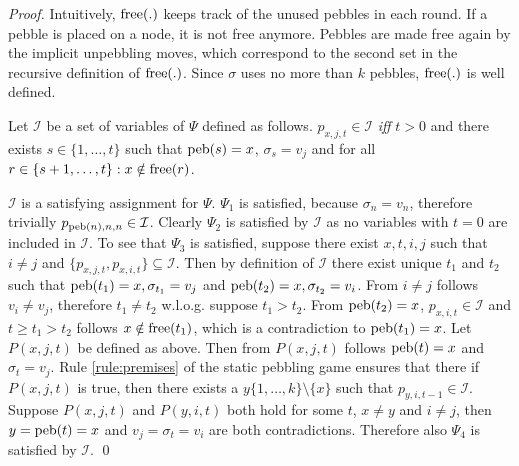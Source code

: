 \begin{proof}
Intuitively, $\operatorname{free}(.)$ keeps track of the unused pebbles in each round.
If a pebble is placed on a node, it is not free anymore.
Pebbles are made free again by the implicit unpebbling moves, which correspond to the second set in the recursive definition of $\operatorname{free}(.)$.
Since $\sigma$ uses no more than $k$ pebbles, $\operatorname{free}(.)$ is well defined.

Let $\mathcal{I}$ be a set of variables of $\Psi$ defined as follows.
$p_{x,j,t} \in \mathcal{I}$ \emph{iff} $t > 0$ and there exists $s \in \{1,\ldots,t\}$ such that $\operatorname{peb}(s) = x$, $\sigma_s = v_j$ and for all $r \in \{s+1,\ldots,t\}: x \notin \operatorname{free}(r)$.

$\mathcal{I}$ is a satisfying assignment for $\Psi$.
$\Psi_1$ is satisfied, because $\sigma_n = v_n$, therefore trivially $p_{\operatorname{peb}(n),n,n} \in \mathcal{I}$.
Clearly $\Psi_2$ is satisfied by $\mathcal{I}$ as no variables with $t = 0$ are included in $\mathcal{I}$.
To see that $\Psi_3$ is satisfied, suppose there exist $x,t,i,j$ such that $i \neq j$ and $\{p_{x,j,t},p_{x,i,t}\} \subseteq \mathcal{I}$.
Then by definition of $\mathcal{I}$ there exist unique $t_1$ and $t_2$ such that $\operatorname{peb}(t_1) = x, \sigma_{t_1} = v_j$ and $\operatorname{peb}(t_2) = x, \sigma_{t_2} = v_i$.
From $i \neq j$ follows $v_i \neq v_j$, therefore $t_1 \neq t_2$ w.l.o.g. suppose $t_1 > t_2$.
From $\operatorname{peb}(t_2) = x$, $p_{x,i,t} \in \mathcal{I}$ and $t \geq t_1 > t_2$ follows $x \notin \operatorname{free}(t_1)$, which is a contradiction to $\operatorname{peb}(t_1) = x$.
Let $P(x,j,t)$ be defined as above. Then from $P(x,j,t)$ follows $\operatorname{peb}(t) = x$ and $\sigma_t = v_j$.
Rule \ref{rule:premises} of the static pebbling game ensures that there if $P(x,j,t)$ is true, then there exists a $y \{1,\ldots,k\} \setminus \{x\}$ such that $p_{y,i,t-1} \in \mathcal{I}$.
Suppose $P(x,j,t)$ and $P(y,i,t)$ both hold for some $t$, $x \neq y$ and $i \neq j$, then $y = \operatorname{peb}(t) = x$ and $v_j = \sigma_t = v_i$ are both contradictions. 
Therefore also $\Psi_4$ is satisfied by $\mathcal{I}$.
\qed
\end{proof}